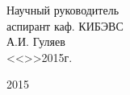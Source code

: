 \vfill

\begin{flushright}
\begin{minipage}{0.45\textwidth}
 \begin{flushleft}
  Научный руководитель \\
  аспирант каф. КИБЭВС \\
  \underline{\hspace{3cm}}А.И. Гуляев \\
  <<\underline{\hspace{1cm}}>>\underline{\hspace{3cm}}2015г.\\
 \end{flushleft}
\end{minipage}
\end{flushright}

\vfill

\begin{center}
 2015
\end{center}
